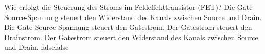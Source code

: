     {Wie erfolgt die Steuerung des Stroms im Feldeffekttransistor (FET)?}
    {Die Gate-Source-Spannung steuert den Widerstand des Kanals zwischen Source und Drain.}
    {Die Gate-Source-Spannung steuert den Gatestrom.}
    {Der Gatestrom steuert den Drainstrom.}
    {Der Gatestrom steuert den Widerstand des Kanals zwischen Source und Drain.}
    {false}{false}